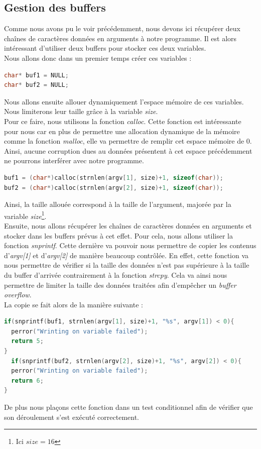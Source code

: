 \subsection{Gestion des buffers}

Comme nous avons pu le voir précédemment, nous devons ici récupérer deux chaînes de caractères données en arguments à notre programme. Il est alors intéressant d'utiliser deux buffers pour stocker ces deux variables.\\
Nous allons donc dans un premier temps créer ces variables :
\begin{lstlisting}[language=C]
char* buf1 = NULL;
char* buf2 = NULL;
\end{lstlisting}
Nous allons ensuite allouer dynamiquement l'espace mémoire de ces variables. Nous limiterons leur taille grâce à la variable \textit{size}.\\
Pour ce faire, nous utilisons la fonction \textit{calloc}. Cette fonction est intéressante pour nous car en plus de permettre une allocation dynamique de la mémoire comme la fonction \textit{malloc}, elle va permettre de remplir cet espace mémoire de 0. Ainsi, aucune corruption dues au données présentent à cet espace précédemment ne pourrons interférer avec notre programme.
\begin{lstlisting}[language=C]
buf1 = (char*)calloc(strnlen(argv[1], size)+1, sizeof(char));
buf2 = (char*)calloc(strnlen(argv[2], size)+1, sizeof(char));
\end{lstlisting}
Ainsi, la taille allouée correspond à la taille de l'argument, majorée par la variable \textit{size}\footnote{Ici $\textit{size} = 16$}.\\
Ensuite, nous allons récupérer les chaînes de caractères données en arguments et stocker dans les buffers prévus à cet effet. Pour cela, nous allons utiliser la fonction \textit{snprintf}. Cette dernière va pouvoir nous permettre de copier les contenus d'\textit{argv[1]} et d'\textit{argv[2]} de manière beaucoup contrôlée. En effet, cette fonction va nous permettre de vérifier si la taille des données n'est pas supérieure à la taille du buffer d'arrivée contrairement à la fonction \textit{strcpy}. Cela va ainsi nous permettre de limiter la taille des données traitées afin d'empêcher un \textit{buffer overflow}.\\
La copie se fait alors de la manière suivante :
\begin{lstlisting}[language=C]
if(snprintf(buf1, strnlen(argv[1], size)+1, "%s", argv[1]) < 0){
  perror("Wrinting on variable failed");
  return 5;
}
  if(snprintf(buf2, strnlen(argv[2], size)+1, "%s", argv[2]) < 0){
  perror("Wrinting on variable failed");
  return 6;
}
\end{lstlisting}
De plus nous plaçons cette fonction dans un test conditionnel afin de vérifier que son déroulement s'est exécuté correctement.


